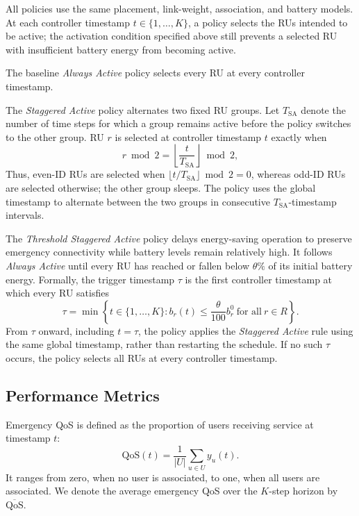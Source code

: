 All policies use the same placement, link-weight, association, and battery models.  At each controller timestamp \(t\in\{1,\ldots,K\}\), a policy selects the RUs intended to be active; the activation condition specified above still prevents a selected RU with insufficient battery energy from becoming active.

The baseline \emph{Always Active} policy selects every RU at every controller timestamp.

The \emph{Staggered Active} policy alternates two fixed RU groups. Let \(T_{\mathrm{SA}}\) denote the number of time steps for which a group remains active before the policy switches to the other group. RU \(r\) is selected at controller timestamp \(t\) exactly when
\begin{equation}
 r\bmod2=\left\lfloor\frac{t}{T_{\mathrm{SA}}}\right\rfloor\bmod2,
 \label{eq:staggered-policy}
\end{equation}
Thus, even-ID RUs are selected when \(\lfloor t/T_{\mathrm{SA}}\rfloor\bmod2=0\), whereas odd-ID RUs are selected otherwise; the other group sleeps. The policy uses the global timestamp to alternate between the two groups in consecutive \(T_{\mathrm{SA}}\)-timestamp intervals.

The \emph{Threshold Staggered Active} policy delays energy-saving operation to preserve emergency connectivity while battery levels remain relatively high. It follows \emph{Always Active} until every RU has reached or fallen below \(\theta\%\) of its initial battery energy. Formally, the trigger timestamp \(\tau\) is the first controller timestamp at which every RU satisfies
\begin{equation}
 \tau=\min\left\{t\in\{1,\ldots,K\}:b_r(t)\leq
 \frac{\theta}{100}b_r^0\ \text{for all}\ r\in R\right\}.
 \label{eq:threshold-trigger}
\end{equation}
From \(\tau\) onward, including \(t=\tau\), the policy applies the \emph{Staggered Active} rule using the same global timestamp, rather than restarting the schedule. If no such \(\tau\) occurs, the policy selects all RUs at every controller timestamp.

\subsection{Performance Metrics}

Emergency QoS is defined as the proportion of users receiving service at timestamp \(t\):
\begin{equation}
 \mathrm{QoS}(t)=\frac{1}{|U|}\sum_{u\in U}y_u(t).
\end{equation}
It ranges from zero, when no user is associated, to one, when all users are associated. We denote the average emergency QoS over the \(K\)-step horizon by \(\overline{\mathrm{QoS}}\).

